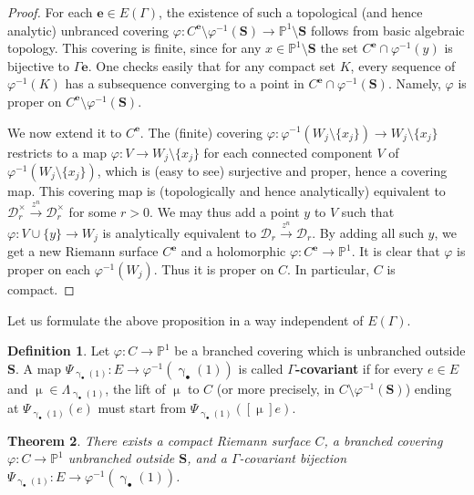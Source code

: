 \documentclass[12pt,a4paper,notitlepage]{article}
\theoremstyle{definition}
\newtheorem{df}{Definition}[subsection]
\theoremstyle{plain}
\newtheorem{thm}[df]{Theorem}
\newcommand{\mc}{\mathcal}
\newcommand{\mbf}{\mathbf}
\newcommand{\blt}{\bullet}
\newcommand{\Pbb}{\mathbb P}
\newcommand{\Sbf}{\mathbf{S}}
\numberwithin{equation}{subsection}
\begin{document}
\begin{proof}
For each $\mbf e\in E(\Gamma)$, the existence of such a topological (and hence analytic) unbranced covering $\varphi:C^{\mbf e}\setminus\varphi^{-1}(\Sbf)\rightarrow\Pbb^1\setminus\Sbf$ follows from basic algebraic topology. This covering is finite, since for any $x\in\Pbb^1\setminus\Sbf$ the set $C^{\mbf e}\cap\varphi^{-1}(y)$ is bijective to $\Gamma \mbf e$. One checks easily that for any compact set $K$, every sequence of $\varphi^{-1}(K)$ has a subsequence converging to a point in $C^{\mbf e}\cap\varphi^{-1}(\Sbf)$. Namely, $\varphi$ is proper on $C^{\mbf e}\setminus\varphi^{-1}(\Sbf)$.

We now extend it to $C^{\mbf e}$. The (finite) covering $\varphi:\varphi^{-1}(W_j\setminus\{x_j\})\rightarrow W_j\setminus\{x_j\}$ restricts to a map $\varphi:V \rightarrow W_j\setminus\{x_j\}$ for each connected component $V$ of $\varphi^{-1}(W_j\setminus\{x_j\})$, which is (easy to see) surjective and proper, hence a covering map. This covering map is (topologically and hence analytically) equivalent to $\mc D_r^\times\xrightarrow{z^n}\mc D_r^\times$ for some $r>0$. We may thus add a point $y$ to $V$ such that $\varphi:V\cup\{y\}\rightarrow W_j$ is analytically equivalent to $\mc D_r\xrightarrow{z^n}\mc D_r$. By adding all such $y$, we get a new Riemann  surface $C^{\mbf e}$ and a holomorphic $\varphi:C^{\mbf e}\rightarrow\Pbb^1$. It is clear that $\varphi$ is proper on each $\varphi^{-1}(W_j)$. Thus it is proper on $C$. In particular, $C$ is compact.
\end{proof}


Let us formulate the above proposition in a way independent of $E(\Gamma)$.

\begin{df}\label{lb66}
Let $\varphi:C\rightarrow\Pbb^1$ be a branched covering which is unbranched outside $\Sbf$. A map $\Psi_{\upgamma_\blt(1)}:E\rightarrow\varphi^{-1}(\upgamma_\blt(1))$ is called \textbf{$\Gamma$-covariant}  if for every $e\in E$ and $\upmu\in\Lambda_{\upgamma_\blt(1)}$, the lift of $\upmu$ to $C$ (or more precisely, in $C\setminus\varphi^{-1}(\Sbf)$) ending at $\Psi_{\upgamma_\blt(1)}(e)$ must start from $\Psi_{\upgamma_\blt(1)}([\upmu]e)$.
\end{df}



\begin{thm}\label{lb38}
There exists a compact Riemann surface $C$, a branched covering $\varphi:C\rightarrow\Pbb^1$ unbranched outside $\Sbf$, and a $\Gamma$-covariant bijection $\Psi_{\upgamma_\blt(1)}:E\rightarrow \varphi^{-1}(\upgamma_\blt(1))$.
\end{thm}
\end{document}
